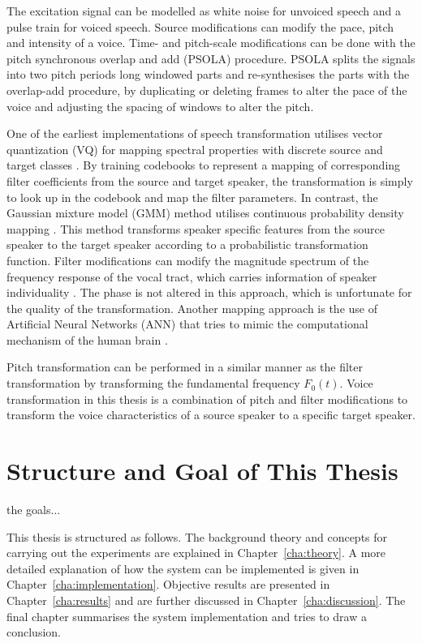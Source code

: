 The excitation signal can be modelled as white noise for unvoiced speech and a pulse train for voiced speech. Source modifications can modify the pace, pitch and intensity of a voice. Time- and pitch-scale modifications can be done with the pitch synchronous overlap and add (PSOLA) procedure. PSOLA splits the signals into two pitch periods long windowed parts and re-synthesises the parts with the overlap-add procedure, by duplicating or deleting frames to alter the pace of the voice and adjusting the spacing of windows to alter the pitch.

One of the earliest implementations of speech transformation utilises vector quantization (VQ) for mapping spectral properties with discrete source and target classes \cite{abe88}. By training codebooks to represent a mapping of corresponding filter coefficients from the source and target speaker, the transformation is simply to look up in the codebook and map the filter parameters. In contrast, the Gaussian mixture model (GMM) method utilises continuous probability density mapping \cite{stylianou98}. This method transforms speaker specific features from the source speaker to the target speaker according to a probabilistic transformation function. Filter modifications can modify the magnitude spectrum of the frequency response of the vocal tract, which carries information of speaker individuality \cite{stylianou09,nguyen09}. The phase is not altered in this approach, which is unfortunate for the quality of the transformation. Another mapping approach is the use of Artificial Neural Networks (ANN) that tries to mimic the computational mechanism of the human brain \cite{desai09,young75}. 

Pitch transformation can be performed in a similar manner as the filter transformation by transforming the fundamental frequency $F_0(t)$. Voice transformation in this thesis is a combination of pitch and filter modifications to transform the voice characteristics of a source speaker to a specific target speaker. 

\section{Structure and Goal of This Thesis} %
\label{sec:structure_and_goal_of_this_thesis}
the goals...

This thesis is structured as follows. The background theory and concepts for carrying out the experiments are explained in Chapter~\ref{cha:theory}. A more detailed explanation of how the system can be implemented is given in Chapter~\ref{cha:implementation}. Objective results are presented in Chapter~\ref{cha:results} and are further discussed in Chapter~\ref{cha:discussion}. The final chapter summarises the system implementation and tries to draw a conclusion.

